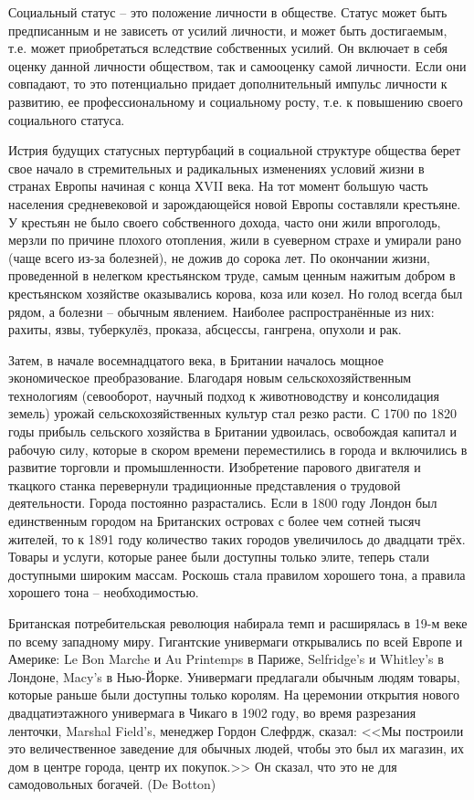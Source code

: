 Социальный статус -- это положение личности в обществе. Статус может быть
предписанным и не зависеть от усилий личности, и может быть достигаемым, т.е.
может приобретаться вследствие собственных усилий. Он включает в себя оценку
данной личности обществом, так и самооценку самой личности. Если они совпадают,
то это потенциально придает дополнительный импульс личности к развитию, ее
профессиональному и социальному росту, т.е. к повышению своего социального
статуса.

Истрия будущих статусных пертурбаций в социальной структуре общества берет свое
начало в стремительных и радикальных изменениях условий жизни в странах Европы
начиная с конца ХVII века. На тот момент большую часть населения средневековой
и зарождающейся новой Европы составляли крестьяне. У крестьян не было своего
собственного дохода, часто они жили впроголодь, мерзли по причине плохого
отопления,  жили в суеверном страхе и умирали  рано (чаще всего из-за болезней),
не дожив до сорока лет. По окончании жизни, проведенной в нелегком крестьянском
труде, самым ценным нажитым добром в крестьянском хозяйстве оказывались корова,
коза или козел. Но голод всегда был рядом, а болезни -- обычным явлением.
Наиболее распространённые из них: рахиты, язвы, туберкулёз, проказа, абсцессы,
гангрена, опухоли и рак.

Затем, в начале восемнадцатого века, в Британии началось мощное экономическое
преобразование. Благодаря новым сельскохозяйственным технологиям (севооборот,
научный подход к животноводству и консолидация земель) урожай
сельскохозяйственных культур стал резко расти. С 1700 по 1820 годы прибыль
сельского хозяйства в Британии удвоилась, освобождая капитал и рабочую силу,
которые в скором времени переместились в города и включились в развитие торговли
и промышленности. Изобретение парового двигателя и ткацкого станка перевернули
традиционные представления о трудовой деятельности. Города постоянно
разрастались. Если в 1800 году Лондон был единственным городом на Британских
островах с более чем сотней тысяч жителей, то к 1891 году количество таких
городов увеличилось до двадцати трёх. Товары и услуги, которые ранее были
доступны только элите, теперь стали доступными широким массам. Роскошь стала
правилом хорошего тона, а правила хорошего тона -- необходимостью.

Британская потребительская революция набирала темп и расширялась в 19-м веке
по всему западному миру. Гигантские универмаги открывались по всей Европе и
Америке: Le Bon Marche и Au Printemps в Париже, Selfridge's и Whitley's в
Лондоне, Macy's в Нью-Йорке. Универмаги предлагали обычным людям товары,
которые раньше были доступны только королям. На церемонии открытия нового
двадцатиэтажного универмага в Чикаго в 1902 году, во время разрезания ленточки,
Marshal Field's, менеджер Гордон Слефрдж, сказал: <<Мы построили это
величественное заведение для обычных людей, чтобы это был их магазин, их дом в
центре города, центр их покупок.>> Он сказал, что это не для самодовольных
богачей. (De Botton)

